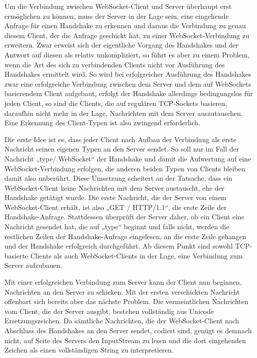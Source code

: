 \documentclass[12pt, onecolumn, notitlepage]{scrartcl}
\begin{document}
Um die Verbindung zwischen WebSocket-Client und Server überhaupt erst ermöglichen zu können, muss der Server in der Lage sein, eine eingehende Anfrage für einen Handshake zu erkennen und daraus die Verbindung zu genau diesem Client, der die Anfrage geschickt hat, zu einer WebSocket-Verbindung zu erweitern. Zwar erweist sich der eigentliche Vorgang des Handshakes und der Antwort auf diesen als relativ unkompliziert, so führt es aber zu einem Problem, wenn die Art des sich zu verbindenden Clients nicht vor Ausführung des Handshakes ermittelt wird. So wird bei erfolgreicher Ausführung des Handshakes zwar eine erfolgreiche Verbindung zwischen dem Server und dem auf WebSockets basierendem Client aufgebaut, erfolgt der Handshake allerdings bedingungslos für jeden Client, so sind die Clients, die auf regulären TCP-Sockets basieren, daraufhin nicht mehr in der Lage, Nachrichten mit dem Server auszutauschen. Eine Erkennung des Client-Typen ist also zwingend erforderlich. \par

Die erste Idee ist es, dass jeder Client nach Aufbau der Verbindung als erste Nachricht seinen eigenen Typen an den Server sendet. So soll nur im Fall der Nachricht „type/.WebSocket“ der Handshake und damit die Aufwertung auf eine WebSocket-Verbindung erfolgen, die anderen beiden Typen von Clients bleiben damit also unberührt. Diese Umsetzung scheitert an der Tatsache, dass ein WebSocket-Client keine Nachrichten mit dem Server austauscht, ehe der Handshake getätigt wurde. Die erste Nachricht, die der Server von einem WebSocket-Client erhält, ist also „GET / HTTP/1.1“, die erste Zeile der Handshake-Anfrage. Stattdessen überprüft der Server daher, ob ein Client eine Nachricht gesendet hat, die auf „type“ beginnt und falls nicht, werden die restlichen Zeilen der Handshake-Anfrage eingelesen,  an die erste Zeile gehangen und der Handshake erfolgreich durchgeführt. Ab diesem Punkt sind sowohl TCP-basierte Clients als auch WebSocket-Clients in der Lage, eine Verbindung zum Server aufzubauen. \par

Mit einer erfolgreichen Verbindung zum Server kann der Client nun beginnen, Nachrichten an den Server zu schicken. Mit der ersten verschickten Nachricht offenbart sich bereits aber das nächste Problem. Die vermeintlichen Nachrichten vom Client, die der Server ausgibt, bestehen vollständig aus Unicode Ersetzungszeichen. Da sämtliche Nachrichten, die der WebSocket-Client nach Abschluss des Handshakes an den Server sendet, codiert sind, genügt es demnach nicht, auf Seite des Servers den InputStream zu lesen und die dort eingehenden Zeichen als einen vollständigen String zu interpretieren. \par
\end{document}
